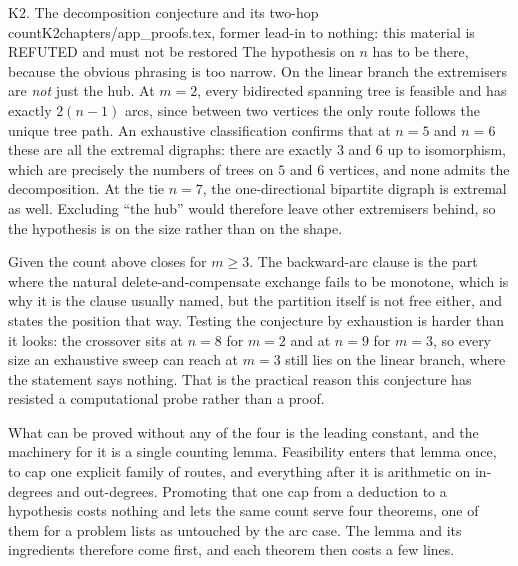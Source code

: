 \begin{offcut}{K2. The decomposition conjecture and its two-hop count}{K2}{chapters/app\_proofs.tex, former lead-in to }{nothing: this material is REFUTED and must not be restored}
The hypothesis on $n$ has to be there, because the obvious phrasing is too narrow. On the linear branch the extremisers are \emph{not} just the hub. At $m = 2$, every bidirected spanning tree is feasible and has exactly $2(n-1)$ arcs, since between two vertices the only route follows the unique tree path. An exhaustive classification confirms that at $n = 5$ and $n = 6$ these are all the extremal digraphs: there are exactly $3$ and $6$ up to isomorphism, which are precisely the numbers of trees on $5$ and $6$ vertices, and none admits the decomposition. At the tie $n=7$, the one-directional bipartite digraph is extremal as well. Excluding ``the hub'' would therefore leave other extremisers behind, so the hypothesis is on the size rather than on the shape.

Given  the count above closes  for $m \ge 3$. The backward-arc clause is the part where the natural delete-and-compensate exchange fails to be monotone, which is why it is the clause usually named, but the partition itself is not free either, and  states the position that way. Testing the conjecture by exhaustion is harder than it looks: the crossover sits at $n = 8$ for $m = 2$ and at $n = 9$ for $m = 3$, so every size an exhaustive sweep can reach at $m = 3$ still lies on the linear branch, where the statement says nothing. That is the practical reason this conjecture has resisted a computational probe rather than a proof.

What can be proved without any of the four is the leading constant, and the machinery for it is a single counting lemma. Feasibility enters that lemma once, to cap one explicit family of routes, and everything after it is arithmetic on in-degrees and out-degrees. Promoting that one cap from a deduction to a hypothesis costs nothing and lets the same count serve four theorems, one of them for a problem  lists as untouched by the arc case. The lemma and its ingredients therefore come first, and each theorem then costs a few lines.

\end{offcut}


